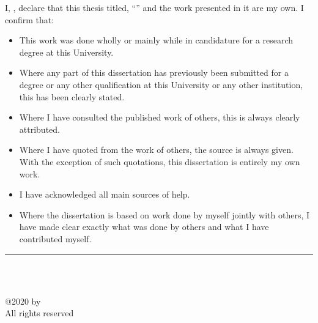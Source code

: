 \documentclass[
11pt, 
oneside,
english,
onehalfspacing,
onehalfspacing,
parskip,
headsepline,
]{MastersDoctoralThesis}
\begin{document}
\begin{declaration}
\noindent I, \authorname, declare that this thesis titled, \enquote{\ttitle} and the work presented in it are my own. I confirm that:

\begin{itemize} 
\item This work was done wholly or mainly while in candidature for a research degree at this University.
\item	Where any part of this dissertation has previously been submitted for a degree or any other qualification at this University or any other institution, this has been clearly stated.
\item	Where I have consulted the published work of others, this is always clearly attributed.
\item	Where I have quoted from the work of others, the source is always given. With the exception of such quotations, this dissertation is entirely my own work.
\item	I have acknowledged all main sources of help.
\item	Where the dissertation is based on work done by myself jointly with others, I have made clear exactly what was done by others and what I have contributed myself.
\\
\end{itemize}

\bigskip 

\begin{flushright}
\noindent \rule[0.0em]{15em}{0.5pt}\\ %
\authorname\\
\examDate
\end{flushright}

\vfill

\begin{center}
@2020 by \authorname\\
All rights reserved
\end{center}

\end{declaration}

\cleardoublepage


\vspace*{\fill}
\end{document}
